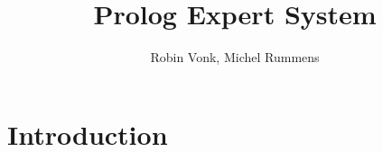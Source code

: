 \documentclass{article}
\title{Prolog Expert System}
\author{Robin Vonk, Michel Rummens}
\date{}
\begin{document}
\maketitle

\section{Introduction}
\end{document}
